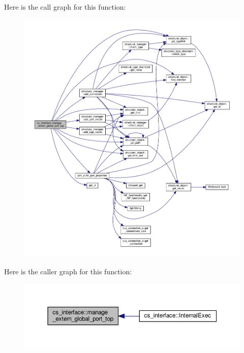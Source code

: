 Here is the call graph for this function\+:
\nopagebreak
\begin{figure}[H]
\begin{center}
\leavevmode
\includegraphics[width=350pt]{d1/dfa/classcs__interface_a1079f7e26ff08aef06667ecd87181c7d_cgraph}
\end{center}
\end{figure}
Here is the caller graph for this function\+:
\nopagebreak
\begin{figure}[H]
\begin{center}
\leavevmode
\includegraphics[width=350pt]{d1/dfa/classcs__interface_a1079f7e26ff08aef06667ecd87181c7d_icgraph}
\end{center}
\end{figure}
\mbox{\label{classcs__interface_a6c229dab4a01f3cde49f836faefde734}} 
